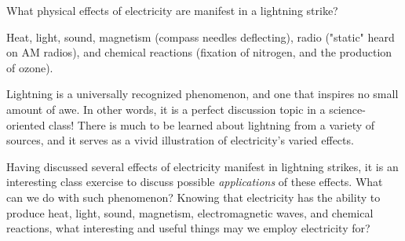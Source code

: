 

What physical effects of electricity are manifest in a lightning strike?







Heat, light, sound, magnetism (compass needles deflecting), radio ("static" heard on AM radios), and chemical reactions (fixation of nitrogen, and the production of ozone).







Lightning is a universally recognized phenomenon, and one that inspires no small amount of awe.  In other words, it is a perfect discussion topic in a science-oriented class!  There is much to be learned about lightning from a variety of sources, and it serves as a vivid illustration of electricity's varied effects.

Having discussed several effects of electricity manifest in lightning strikes, it is an interesting class exercise to discuss possible {\it applications} of these effects.  What can we do with such phenomenon?  Knowing that electricity has the ability to produce heat, light, sound, magnetism, electromagnetic waves, and chemical reactions, what interesting and useful things may we employ electricity for?




